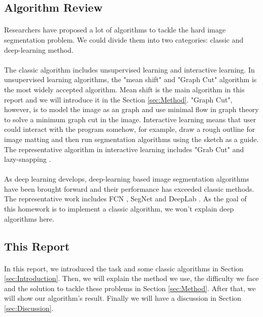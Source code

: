 \documentclass{gapd}
\begin{document}
\subsection{Algorithm Review}
\paragraph{}
	Researchers have proposed a lot of algorithms to tackle the hard image segmentation problem. We could divide them into two categories: classic and deep-learning method. 
\paragraph{}
	The classic algorithm includes unsupervised learning and interactive learning. In unsupervised learning algorithms, the "mean shift" \cite{comaniciu2002mean} and "Graph Cut" \cite{felzenszwalb2004efficient} algorithm is the most widely accepted algorithm. Mean shift is the main algorithm in this report and we will introduce it in the Section \ref{sec:Method}. "Graph Cut", however, is to model the image as an graph and use minimal flow in graph theory to solve a minimum graph cut in the image. Interactive learning means that user could interact with the program somehow, for example, draw a rough outline for image matting and then run segmentation algorithms using the sketch as a guide. The representative algorithm in interactive learning includes "Grab Cut" \cite{rother2004grabcut} and lazy-snapping \cite{li2004lazy}. 
\paragraph{}
	As deep learning develops, deep-learning based image segmentation algorithms have been brought forward and their performance has exceeded classic methods. The representative work includes FCN \cite{long2015fully}, SegNet \cite{badrinarayanan2017segnet} and DeepLab \cite{chen2018deeplab}. As the goal of this homework is to implement a classic algorithm, we won't explain deep algorithms here. 
		
\subsection{This Report}
\paragraph{}
	In this report, we introduced the task and some classic algorithms in Section \ref{sec:Introduction}. Then, we will explain the method we use, the difficulty we face and the solution to tackle these problems in Section \ref{sec:Method}. After that, we will show our algorithm's result. Finally we will have a discussion in Section \ref{sec:Discussion}. 
	
\end{document}
